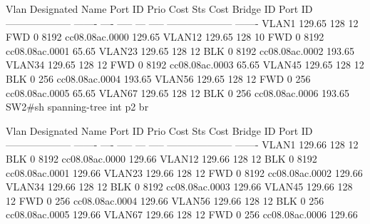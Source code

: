 \documentclass[10pt]{article}
\begin{document}
\begin{itemize}
\begin{verbatim*}
		Vlan                                        Designated
		Name                 Port ID Prio Cost  Sts Cost  Bridge ID            Port ID
		-------------------- ------- ---- ----- --- ----- -------------------- -------
		VLAN1                129.65   128    12 FWD     0  8192 cc08.08ac.0000 129.65
		VLAN12               129.65   128    10 FWD     0  8192 cc08.08ac.0001  65.65
		VLAN23               129.65   128    12 BLK     0  8192 cc08.08ac.0002 193.65
		VLAN34               129.65   128    12 FWD     0  8192 cc08.08ac.0003  65.65
		VLAN45               129.65   128    12 BLK     0   256 cc08.08ac.0004 193.65
		VLAN56               129.65   128    12 FWD     0   256 cc08.08ac.0005  65.65
		VLAN67               129.65   128    12 BLK     0   256 cc08.08ac.0006 193.65
		SW2#sh spanning-tree int p2 br

		Vlan                                        Designated
		Name                 Port ID Prio Cost  Sts Cost  Bridge ID            Port ID
		-------------------- ------- ---- ----- --- ----- -------------------- -------
		VLAN1                129.66   128    12 BLK     0  8192 cc08.08ac.0000 129.66
		VLAN12               129.66   128    12 BLK     0  8192 cc08.08ac.0001 129.66
		VLAN23               129.66   128    12 FWD     0  8192 cc08.08ac.0002 129.66
		VLAN34               129.66   128    12 BLK     0  8192 cc08.08ac.0003 129.66
		VLAN45               129.66   128    12 FWD     0   256 cc08.08ac.0004 129.66
		VLAN56               129.66   128    12 BLK     0   256 cc08.08ac.0005 129.66
		VLAN67               129.66   128    12 FWD     0   256 cc08.08ac.0006 129.66
	\end{verbatim*}
\end{itemize}
\end{document}
